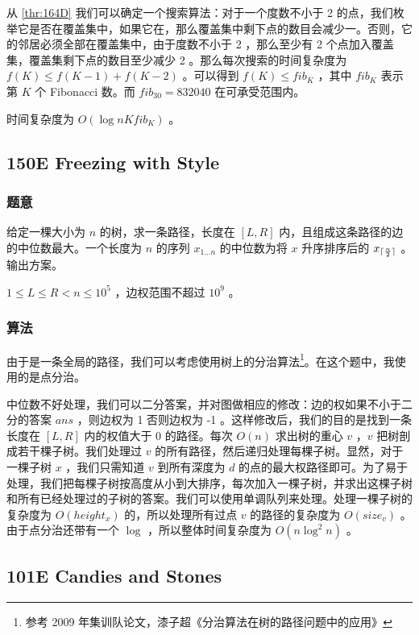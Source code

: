 \documentclass[11pt]{article}
\begin{document}
    从 \ref{thr:164D} 我们可以确定一个搜索算法：对于一个度数不小于 2 的点，我们枚举它是否在覆盖集中，如果它在，那么覆盖集中剩下点的数目会减少一。否则，它的邻居必须全部在覆盖集中，由于度数不小于 2 ，那么至少有 2 个点加入覆盖集，覆盖集剩下点的数目至少减少 2 。那么每次搜索的时间复杂度为 $f(K) \leq f(K - 1) + f(K - 2)$ 。可以得到 $f(K) \leq fib_K$ ，其中 $fib_K$ 表示第 $K$ 个 Fibonacci 数。而 $fib_{30} = 832040$ 在可承受范围内。

    时间复杂度为 $O(\log n K fib_K)$ 。
\subsection{150E  Freezing with Style}
\label{sec-7-7}
\subsubsection{题意}
\label{sec-7-7-1}

    给定一棵大小为 $n$ 的树，求一条路径，长度在 $[L, R]$ 内，且组成这条路径的边的中位数最大。一个长度为 $n$ 的序列 $x_{1 \dots n}$ 的中位数为将 $x$ 升序排序后的 $x_{{\lceil \frac{n}{2} \rceil}}$ 。输出方案。

    $1 \leq L \leq R < n \leq 10^5$ ，边权范围不超过 $10^9$ 。
\subsubsection{算法}
\label{sec-7-7-2}

    由于是一条全局的路径，我们可以考虑使用树上的分治算法\footnote{参考 2009 年集训队论文，漆子超《分治算法在树的路径问题中的应用》
 }。在这个题中，我使用的是点分治。

    中位数不好处理，我们可以二分答案，并对图做相应的修改：边的权如果不小于二分的答案 $ans$ ，则边权为 1 否则边权为 -1 。这样修改后，我们的目的是找到一条长度在 $[L, R]$ 内的权值大于 0 的路径。每次 $O(n)$ 求出树的重心 $v$ ，$v$ 把树剖成若干棵子树。我们处理过 $v$ 的所有路径，然后递归处理每棵子树。显然，对于一棵子树 $x$ ，我们只需知道 $v$ 到所有深度为 $d$ 的点的最大权路径即可。为了易于处理，我们把每棵子树按高度从小到大排序，每次加入一棵子树，并求出这棵子树和所有已经处理过的子树的答案。我们可以使用单调队列来处理。处理一棵子树的复杂度为 $O(height_x)$ 的，所以处理所有过点 $v$ 的路径的复杂度为 $O(size_v)$ 。由于点分治还带有一个 $\log$ ，所以整体时间复杂度为 $O(n \log^2 n)$ 。
\subsection{101E  Candies and Stones}
\label{sec-7-8}
\end{document}
